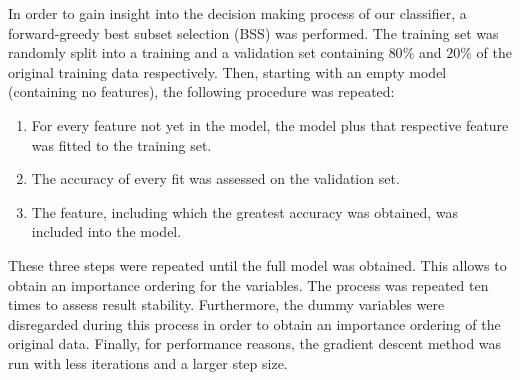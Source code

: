 \documentclass[10pt,conference,compsocconf]{IEEEtran}
\begin{document}
\par
In order to gain insight into the decision making process of our classifier, a forward-greedy best subset selection (BSS) was performed. The training set was randomly split into a training and a validation set containing $80\%$ and $20\%$ of the original training data respectively. Then, starting with an empty model (containing no features), the following procedure was repeated: 
\begin{enumerate}
	\item For every feature not yet in the model, the model plus that respective feature was fitted to the training set.
	\item The accuracy of every fit was assessed on the validation set.  
	\item The feature, including which the greatest accuracy was obtained, was included into the model.
\end{enumerate}
These three steps were repeated until the full model was obtained. This allows to obtain an importance ordering for the variables. The process was repeated ten times to assess result stability. Furthermore, the dummy variables were disregarded during this process in order to obtain an importance ordering of the original data. Finally, for performance reasons, the gradient descent method was run with less iterations and a larger step size.
\end{document}
